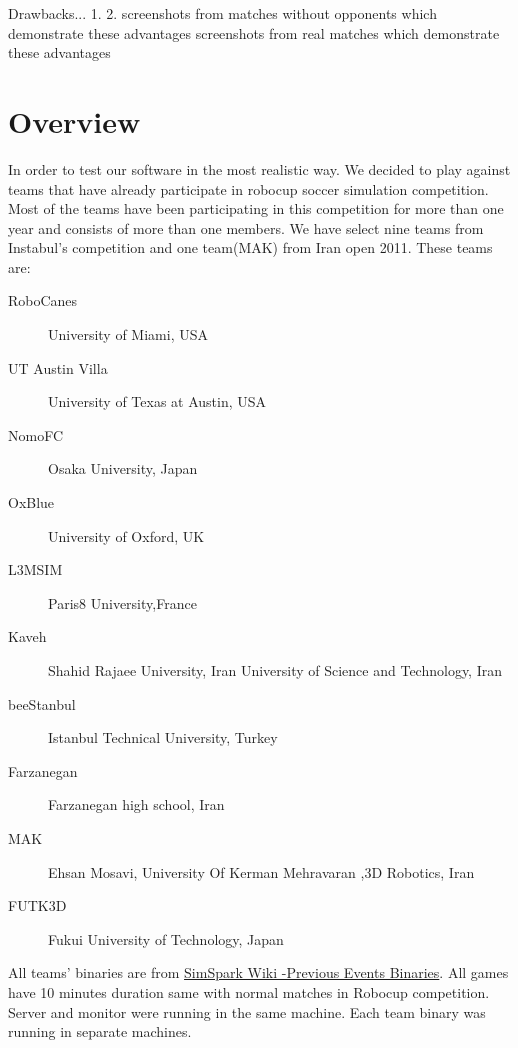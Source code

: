 Drawbacks...
1.
2.
screenshots from matches without opponents which demonstrate these advantages
screenshots from real matches which demonstrate these advantages

\section{Overview}
In order to test our software in the most realistic way. We decided to play against teams that have already participate in robocup soccer simulation competition. Most of the teams have been participating in this competition for more than one year and consists of more than one members. We have select nine teams from Instabul's competition and one team(MAK) from Iran open 2011. These teams are:
\begin{description}
\item[RoboCanes]	University of Miami, USA 
\item[UT Austin Villa]	University of Texas at Austin, USA
\item[NomoFC]	Osaka University, Japan
\item[OxBlue]	University of Oxford, UK
\item[L3MSIM]	Paris8 University,France
\item[Kaveh] 	Shahid Rajaee University, Iran University of Science and Technology, Iran
\item[beeStanbul]	Istanbul Technical University, Turkey
\item[Farzanegan]	Farzanegan high school, Iran
\item[MAK]	Ehsan Mosavi, University Of Kerman Mehravaran ,3D Robotics, Iran
\item[FUTK3D]	Fukui University of Technology, Japan
\end{description}
All teams' binaries are from \href{http://simspark.sourceforge.net/binaries/RoboCup2011/}{SimSpark Wiki -Previous Events Binaries}.
All games have 10 minutes duration same with normal matches in Robocup competition. Server and monitor were running in the same machine\footnotemark. Each team binary was running in separate machines\footnotemark.
